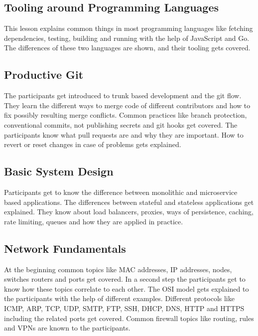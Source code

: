\documentclass{article}
\begin{document}
\subsection{Tooling around Programming Languages}

This lesson explains common things in most programming languages like fetching
dependencies, testing, building and running with the help of JavaScript and Go.
The differences of these two languages are shown, and their tooling gets
covered.

\newpage

\subsection{Productive Git}

The participants get introduced to trunk based development and the git flow.
They learn the different ways to merge code of different contributors and how to
fix possibly resulting merge conflicts. Common practices like branch protection,
conventional commits, not publishing secrets and git hooks get covered. The
participants know what pull requests are and why they are important. How to
revert or reset changes in case of problems gets explained.

\subsection{Basic System Design}

Participants get to know the difference between monolithic and microservice
based applications. The differences between stateful and stateless applications
get explained. They know about load balancers, proxies, ways of persistence,
caching, rate limiting, queues and how they are applied in practice.

\subsection{Network Fundamentals}

At the beginning common topics like MAC addresses, IP addresses, nodes, switches
routers and ports get covered. In a second step the participants get to know how
these topics correlate to each other. The OSI model gets explained to the
participants with the help of different examples. Different protocols like ICMP,
ARP, TCP, UDP, SMTP, FTP, SSH, DHCP, DNS, HTTP and HTTPS including the related
ports get covered. Common firewall topics like routing, rules and VPNs are known
to the participants.
\end{document}
